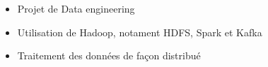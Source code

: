 \documentclass[10pt,a4paper,ragged2e,withhyper]{altacv}
\begin{document}
\begin{paracol}{2}

\divider
{}
\divider
{}

\switchcolumn


\begin{comment}
\cvevent{Projet TIGER}{}{février 2022 -- 2 mois}{}
\begin{itemize}
\item Développement d'un compilateur en C++
\item Gestion du travail en équipe
\item Travail de lecture de code fourni
\end{itemize}

\divider

\cvevent{Projet JWS}{}{janvier 2022 -- 1 mois}{}
\begin{itemize}
\item Rush d'apprentissage du language Java
\item Test des compétences sur un projet final : Un serveur de jeu Bomberman
\item Découverte du framework quarkus et de l'utilisation d'une API REST
\end{itemize}

\divider

\cvevent{Projet 42SH}{}{décembre 2021 -- 1 mois}{}
\begin{itemize}
\item Développement d'un shell en C
\item Gestion du travail en équipe 
\end{itemize}

\divider

\cvevent{Python Big data}{}{Février 2023 -- 1 mois}{}
\begin{itemize}
    \item Travail avec pandas et numpy pour analyser des données
    \item Analyse de données sur la blockchain du bitcoin
\end{itemize}
\divider

\end{comment}
\begin{itemize}
    \item Projet de Data engineering
    \item Utilisation de Hadoop, notament HDFS, Spark et Kafka
    \item Traitement des données de façon distribué
\end{itemize}


\end{paracol}
\end{document}
